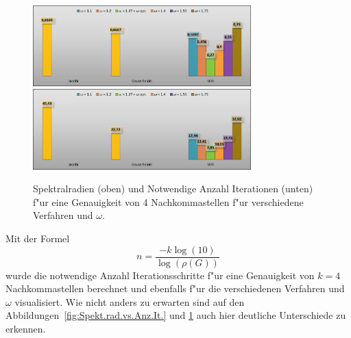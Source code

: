 \begin{refsection}
\begin{figure}\centering
\includegraphics[width=0.75\textwidth]{sor/img/Spektralradius_Diagramm_2.png}
\includegraphics[width=0.75\textwidth]{sor/img/NumIt_Diagramm_2.png}
\caption{Spektralradien (oben) und
Notwendige Anzahl Iterationen (unten) f"ur  eine Genauigkeit von
4 Nachkommastellen f"ur verschiedene Verfahren und $\omega$.
\label{fig:Spekt.rad. Diagr.}
\label{fig:It.vs.omega}
}
\end{figure}

Mit der Formel 
\begin{equation} \label{eq: Accuracy}
n=\frac{-k \log{(10)}}{\log{(\rho(G))}}
\end{equation}
wurde die notwendige Anzahl Iterationsschritte f"ur eine Genauigkeit von
$k=4$ Nachkommastellen berechnet und ebenfalls f"ur die verschiedenen
Verfahren und $\omega$ visualisiert. Wie nicht anders zu erwarten
sind auf den Abbildungen~\ref{fig:Spekt.rad.vs.Anz.It.} und
\ref{fig:It.vs.omega} auch hier deutliche Unterschiede zu erkennen.


\end{refsection}
